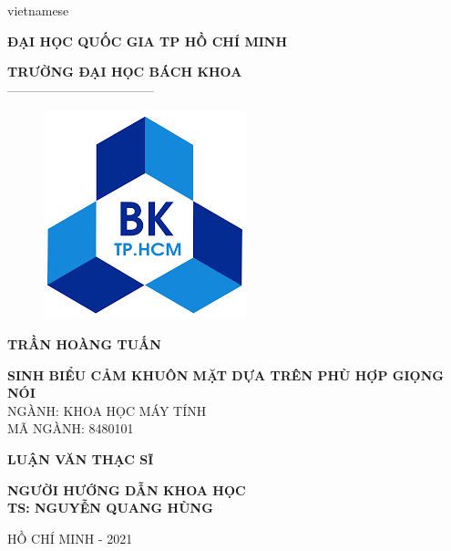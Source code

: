 \begin{titlepage}

\begin{center}

\vspace*{3\bigskipamount}

\begin{otherlanguage*}{vietnamese}

\makeatletter
\fontsize{12}{12}\textbf{ĐẠI HỌC QUỐC GIA TP HỒ CHÍ MINH}
\makeatother

\makeatletter
\fontsize{14}{14}\textbf{TRƯỜNG ĐẠI HỌC BÁCH KHOA}\\
\fontsize{14}{14} -----------------------------------
\makeatother

\begin{figure}[h]
	\centering
    \includegraphics[width=0.4\columnwidth]{./cover/bk.png}
\end{figure}

{\makeatletter
\fontsize{16}{16}\textbf{TRẦN HOÀNG TUẤN}
\makeatother}

\vspace{1cm}

{\makeatletter
\fontsize{16}{16}\textbf{SINH BIỂU CẢM KHUÔN MẶT DỰA TRÊN PHÙ HỢP GIỌNG NÓI}\\
\vspace{1cm}
\fontsize{12}{12} NGÀNH: KHOA HỌC MÁY TÍNH\\
\fontsize{12}{12} MÃ NGÀNH: 8480101\\
\makeatother}

\vspace{1cm}
{\makeatletter
\fontsize{12}{12}\textbf{LUẬN VĂN THẠC SĨ}\\
\makeatother}

\vspace{1cm}
{\makeatletter
\fontsize{12}{12}\textbf{NGƯỜI HƯỚNG DẪN KHOA HỌC}\\
\fontsize{12}{12}\textbf{TS: NGUYỄN QUANG HÙNG}\\
\makeatother}

\vspace{4cm}
{\makeatletter
\fontsize{12}{12} HỒ CHÍ MINH - 2021\\
\makeatother}

\end{otherlanguage*}

\vfill
\end{center}
\end{titlepage}

